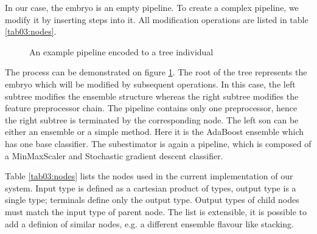 In our case, the embryo is an empty pipeline. To create a complex pipeline, we
modify it by inserting steps into it. All modification operations are listed in
table \ref{tab03:nodes}.

\begin{figure}[ht]\centering
    \qquad
    \caption{An example pipeline encoded to a tree individual}%
    \label{pic:pipeencoding}%
\end{figure}

The process can be demonstrated on figure
\ref{pic:pipeencoding}. The root of the tree represents the embryo which will
be modified by subsequent operations. In this case, the left subtree modifies
the ensemble structure whereas the right subtree modifies the feature
preprocessor chain. The pipeline contains only one preprocessor, hence the
right subtree is terminated by the corresponding node. The left son can be
either an ensemble or a simple method. Here it is the AdaBoost ensemble which
has one base classifier. The subestimator is again a pipeline, which is composed
of a MinMaxScaler and Stochastic gradient descent classifier.

Table \ref{tab03:nodes} lists the nodes used in the current implementation of
our system. Input type is defined as a cartesian product of types, output type
is a single type; terminals define only the output type. Output types of child
nodes must match the input type of parent node. The list is extensible, it is
possible to add a definion of similar nodes, e.g. a different ensemble flavour
like stacking.

